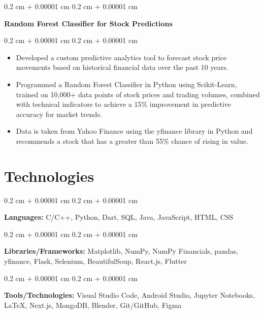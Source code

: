 \documentclass[10pt, letterpaper]{article}
\newenvironment{highlights}{
    \begin{itemize}[
        topsep=0.10 cm,
        parsep=0.10 cm,
        partopsep=0pt,
        itemsep=0pt,
        leftmargin=0.4 cm + 10pt
    ]
}{
    \end{itemize}
} %
\newenvironment{onecolentry}{
    \begin{adjustwidth}{
        0.2 cm + 0.00001 cm
    }{
        0.2 cm + 0.00001 cm
    }
}{
    \end{adjustwidth}
} %
\newenvironment{twocolentry}[2][]{
    \onecolentry
    \def\secondColumn{#2}
    \setcolumnwidth{\fill, 4.5 cm}
    \begin{paracol}{2}
}{
    \switchcolumn \raggedleft \secondColumn
    \end{paracol}
    \endonecolentry
} %
\let\hrefWithoutArrow\href
\renewcommand{\href}[2]{\hrefWithoutArrow{#1}{\ifthenelse{\equal{#2}{}}{ }{#2 }\raisebox{.15ex}{\footnotesize \faExternalLink*}}}
\begin{document}
        \begin{twocolentry}{
            
            
        \textit{\href{https://github.com/akramj13/ai-stock-predictor}{GitHub Link}}}
            \textbf{Random Forest Classifier for Stock Predictions}
        \end{twocolentry}

        \vspace{0.10 cm}
        \begin{onecolentry}
            \begin{highlights}
                \item Developed a custom predictive analytics tool to forecast stock price movements based on historical financial data over the past 10 years.
                \item Programmed a Random Forest Classifier in Python using Scikit-Learn, trained on 10,000+ data points of stock prices and trading volumes, combined with technical indicators to achieve a 15\% improvement in predictive accuracy for market trends.
                \item Data is taken from Yahoo Finance using the yfinance library in Python and recommends a stock that has a greater than 55\% chance of rising in value.
            \end{highlights}
        \end{onecolentry}



    
    \section{Technologies}



        
        \begin{onecolentry}
            \textbf{Languages:} C/C++, Python, Dart, SQL, Java, JavaScript, HTML, CSS
        \end{onecolentry}

        \vspace{0.2 cm}

        \begin{onecolentry}
            \textbf{Libraries/Frameworks:} Matplotlib, NumPy, NumPy Financials, pandas, yfinance, Flask, Selenium, BeautifulSoup, React.js, Flutter
        \end{onecolentry}

        \vspace{0.2 cm}

        \begin{onecolentry}
            \textbf{Tools/Technologies:} Visual Studio Code, Android Studio, Jupyter Notebooks, LaTeX, Next.js, MongoDB, Blender, Git/GitHub, Figma
        \end{onecolentry}


    
\end{document}
